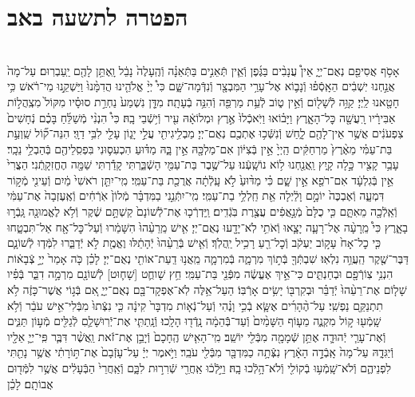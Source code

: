 \documentclass[twoside, openany, parskip=half, 11pt]{book}
\begin{document}
\begin{footnotesize}
\begin{multicols}{2}
\end{multicols}

\section*{הפטרה לתשעה באב}


\begin{multicols}{2}
 \\
אָסֹ֥ף אֲסִיפֵ֖ם נְאֻם־יְיָ֑ אֵין֩ עֲנָבִ֨ים בַּגֶּ֜פֶן וְֿאֵ֧ין תְּֿאֵנִ֣ים בַּתְּֿאֵנָ֗ה וְֿהֶֽעָלֶה֙ נָבֵ֔ל וָֽאֶתֵּ֥ן לָהֶ֖ם יַֽעַבְרֽוּם׃ עַל־מָה֙ אֲנַ֣חְנוּ יֽשְׁבִ֔ים הֵאָֽסְֿפ֗וּ וְֿנָב֛וֹא אֶל־עָרֵ֥י הַמִּבְצָ֖ר וְֿנִדְּֿמָה־שָּׁ֑ם כִּי֩ יְיָ֨ אֱלֹהֵ֤ינוּ הֲדִמָּ֨נוּ֙ וַיַּשְׁקֵ֣נוּ מֵי־רֹ֔אשׁ כִּ֥י חָטָ֖אנוּ לַֽיְיָ׃ קַוֵּ֥ה לְֿשָׁל֖וֹם וְֿאֵ֣ין ט֑וֹב לְֿעֵ֥ת מַרְפֵּ֖ה וְֿהִנֵּ֥ה בְֿעָתָֽה׃ מִדָּ֤ן נִשְׁמַע֙ נַחְרַ֣ת סוּסָ֗יו מִקּוֹל֙ מִצְֽהֲל֣וֹת אַבִּירָ֔יו רָֽעֲשָׁ֖ה כׇּל־הָאָ֑רֶץ וַיָּב֗וֹאוּ וַיֹּֽאכְֿלוּ֙ אֶ֣רֶץ וּמְלוֹאָ֔הּ עִ֖יר וְֿי֥שְֿׁבֵי בָֽהּ׃ כִּי֩ הִנְנִ֨י מְֿשַׁלֵּ֜חַ בָּכֶ֗ם נְֿחָשִׁים֙ צִפְעֹנִ֔ים אֲשֶׁ֥ר אֵין־לָהֶ֖ם לָ֑חַשׁ וְֿנִשְּֿׁכ֥וּ אֶתְכֶ֖ם נְאֻם־יְיָ׃ מַבְלִ֥יגִיתִ֖י עֲלֵ֣י יָג֑וֹן עָלַ֖י לִבִּ֥י דַוָּֽי׃ הִנֵּה־ק֞וֹל שַֽׁוְעַ֣ת בַּת־עַמִּ֗י מֵאֶ֨רֶץ֙ מַרְחַקִּ֔ים הַֽיְיָ֙ אֵ֣ין בְּֿצִיּ֔וֹן אִם־מַלְכָּ֖הּ אֵ֣ין בָּ֑הּ מַדּ֗וּעַ הִכְעִס֛וּנִי בִּפְסִֽלֵיהֶ֖ם בְּֿהַבְלֵ֥י נֵכָֽר׃ עָבַ֥ר קָצִ֖יר כָּ֣לָה קָ֑יִץ וַֽאֲנַ֖חְנוּ ל֥וֹא נוֹשָֽׁעְֿנוּ׃ עַל־שֶׁ֥בֶר בַּת־עַמִּ֖י הָשְֿׁבַּ֑רְתִּי קָדַ֕רְתִּי שַׁמָּ֖ה הֶחֱזִקָֽתְֿנִי׃ הַצֳרִי֙ אֵ֣ין בְּֿגִלְעָ֔ד אִם־רֹפֵ֖א אֵ֣ין שָׁ֑ם כִּ֗י מַדּ֨וּעַ֙ לֹ֣א עָֽלְֿתָ֔ה אֲרֻכַ֖ת בַּת־עַמִּֽי׃ מִֽי־יִתֵּ֤ן רֹאשִׁי֙ מַ֔יִם וְֿעֵינִ֖י מְֿק֣וֹר דִּמְעָ֑ה וְֿאֶבְכֶּה֙ יוֹמָ֣ם וָלַ֔יְלָה אֵ֖ת חַֽלְלֵ֥י בַת־עַמִּֽי׃ מִֽי־יִתְּֿנֵ֣נִי בַמִּדְבָּ֗ר מְֿלוֹן֙ אֹֽרְֿחִ֔ים וְֿאֶֽעֶזְבָה֙ אֶת־עַמִּ֔י וְֿאֵֽלְֿכָ֖ה מֵאִתָּ֑ם כִּ֤י כֻלָּם֙ מְֿנָ֣אֲפִ֔ים עֲצֶ֖רֶת בֹּֽגְֿדִֽים׃ וַֽיַּדְרְֿכ֤וּ אֶת־לְֿשׁוֹנָם֙ קַשְׁתָּ֣ם שֶׁ֔קֶר וְֿלֹ֥א לֶאֱמוּנָ֖ה גָּֽבְֿר֣וּ בָאָ֑רֶץ כִּי֩ מֵֽרָעָ֨ה אֶל־רָעָ֧ה יָצָ֛אוּ וְֿאֹתִ֥י לֹֽא־יָדָ֖עוּ נְאֻם־יְיָ׃ אִ֤ישׁ מֵֽרֵעֵ֨הוּ֙ הִשָּׁמֵ֔רוּ וְֿעַל־כׇּל־אָ֖ח אַל־תִּבְטָ֑חוּ כִּ֤י כׇל־אָח֙ עָק֣וֹב יַעְקֹ֔ב וְֿכׇל־רֵ֖עַ רָכִ֥יל יַֽהֲלֹֽךְ׃ וְֿאִ֤ישׁ בְּֿרֵעֵ֨הוּ֙ יְֿהָתֵ֔לּוּ וֶאֱמֶ֖ת לֹ֣א יְֿדַבֵּ֑רוּ לִמְּֿד֧וּ לְֿשׁוֹנָ֛ם דַּבֶּר־שֶׁ֖קֶר הַֽעֲוֵ֥ה נִלְאֽוּ׃ שִׁבְתְּֿךָ֖ בְּֿת֣וֹךְ מִרְמָ֑ה בְּֿמִרְמָ֛ה מֵֽאֲנ֥וּ דַֽעַת־אוֹתִ֖י נְאֻם־יְיָ׃ לָכֵ֗ן כֹּ֤ה אָמַר֙ יְיָ֣ צְֿבָא֔וֹת הִנְנִ֥י צֽוֹרְֿפָ֖ם וּבְחַנְתִּ֑ים כִּי־אֵ֣יךְ אֶעֱשֶׂ֔ה מִפְּֿנֵ֖י בַּת־עַמִּֽי׃ חֵ֥ץ שָׁוחֻ֛ט [שָׁח֛וּט] לְֿשׁוֹנָ֖ם מִרְמָ֣ה דִבֵּ֑ר בְּֿפִ֗יו שָׁל֤וֹם אֶת־רֵעֵ֨הוּ֙ יְֿדַבֵּ֗ר וּבְקִרְבּ֖וֹ יָשִׂ֥ים אָרְֿבּֽוֹ׃ הַעַל־אֵ֥לֶּה לֹֽא־אֶפְקָד־בָּ֖ם נְאֻם־יְיָ֑ אִ֚ם בְּֿג֣וֹי אֲשֶׁר־כָּזֶ֔ה לֹ֥א תִתְנַקֵּ֖ם נַפְשִֽׁי׃ עַל־הֶ֨הָרִ֜ים אֶשָּׂ֧א בְֿכִ֣י וָנֶ֗הִי וְֿעַל־נְֿא֤וֹת מִדְבָּר֙ קִינָ֔ה כִּ֤י נִצְּֿתוּ֙ מִבְּֿלִי־אִ֣ישׁ עֹבֵ֔ר וְֿלֹ֥א שָֽׁמְֿע֖וּ ק֣וֹל מִקְנֶ֑ה מֵע֤וֹף הַשָּׁמַ֨יִם֙ וְֿעַד־בְּֿֿהֵמָ֔ה נָֽדְֿד֖וּ הָלָֽכוּ׃ וְֿנָֽתַתִּ֧י אֶת־יְֿרֽוּשָׁלַ֛םִ לְֿגַלִּ֖ים מְֿע֣וֹן תַּנִּ֑ים וְֿאֶת־עָרֵ֧י יְֿהוּדָ֛ה אֶתֵּ֥ן שְֿׁמָמָ֖ה מִבְּֿלִ֖י יוֹשֵֽׁב׃ מִֽי־הָאִ֤ישׁ הֶֽחָכָם֙ וְֿיָבֵ֣ן אֶת־זֹ֔את וַֽאֲשֶׁ֨ר דִּבֶּ֧ר פִּֽי־יְיָ֛ אֵלָ֖יו וְֿיַגִּדָ֑הּ עַל־מָה֙ אָֽבְֿדָ֣ה הָאָ֔רֶץ נִצְּֿתָ֥ה כַמִּדְבָּ֖ר מִבְּֿלִ֖י עֹבֵֽר׃ וַיֹּ֣אמֶר יְיָ֔ עַל־עָזְֿבָם֙ אֶת־תּ֣וֹרָתִ֔י אֲשֶׁ֥ר נָתַ֖תִּי לִפְנֵיהֶ֑ם וְֿלֹא־שָֽׁמְֿע֥וּ בְֿקוֹלִ֖י וְֿלֹא־הָ֥לְֿכוּ בָֽהּ׃ וַיֵּ֣לְֿכ֔וּ אַֽחֲרֵ֖י שְֿׁרִר֣וּת לִבָּ֑ם וְֿאַֽחֲרֵי֙ הַבְּֿעָלִ֔ים אֲשֶׁ֥ר לִמְּֿד֖וּם אֲבוֹתָֽם׃ לָכֵ֗ן 
\end{multicols}
\end{footnotesize}
\end{document}
